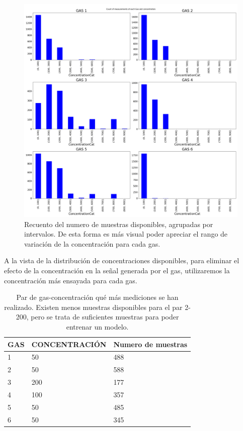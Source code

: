 \begin{figure}
	\centering
	\includegraphics[width=\linewidth]{"../py_imgs/Step0_Concentration Distribution per gas_binned"}
	\caption{Recuento del numero de muestras disponibles, agrupadas por intervalos. De esta forma es más visual poder apreciar el rango de variación de la concentración para cada gas.}
	\label{fig:step0concentration-distribution-per-gas_binned}
\end{figure}

A la vista de la distribución de concentraciones disponibles, para eliminar el efecto de la concentración en la señal generada por el gas, utilizaremos la concentración más ensayada para cada gas. 

\begin{table}
	\centering
	\begin{tabular}{|l|l|l|}
		\toprule
		GAS & CONCENTRACIÓN & Numero de muestras \\ \midrule
		1   & 50  & 488 \\ \hline
		2   & 50  & 588 \\ \hline
		3   & 200 & 177 \\ \hline
		4   & 100 & 357 \\ \hline
		5   & 50  & 485 \\ \hline
		6   & 50  & 345 \\ \bottomrule
	\end{tabular}
	\caption{Par de gas-concentración qué más mediciones se han realizado. Existen menos muestras disponibles para el par 2-200, pero se trata de suficientes muestras para poder entrenar un modelo.  \label{Tab:Par gas-concentracion habitual}}
\end{table}


